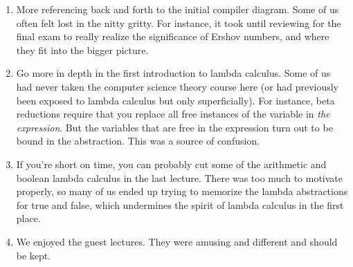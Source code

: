 \begin{enumerate}
\item More referencing back and forth to the initial compiler diagram. Some of us often felt lost in the nitty gritty. For instance, it took until reviewing for the final exam to really realize the significance of Ershov numbers, and where they fit into the bigger picture.
\item Go more in depth in the first introduction to lambda calculus. Some of us had never taken the computer science theory course here (or had previously been exposed to lambda calculus but only superficially). For instance, beta reductions require that you replace all free instances of the variable in \emph{the expression}. But the variables that are free in the expression turn out to be bound in the abstraction. This was a source of confusion. 
\item If you're short on time, you can probably cut some of the arithmetic and boolean lambda calculus in the last lecture. There was too much to motivate properly, so many of us ended up trying to memorize the lambda abstractions for true and false, which undermines the spirit of lambda calculus in the first place.
\item We enjoyed the guest lectures. They were amusing and different and should be kept.
\end{enumerate} 
